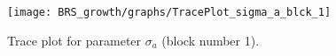 \begin{figure}[H]
\centering
  \texttt{[image: BRS\_growth/graphs/TracePlot\_sigma\_a\_blck\_1]}\\
    \caption{Trace plot for parameter ${\sigma_a}$ (block number 1).}
\end{figure}
